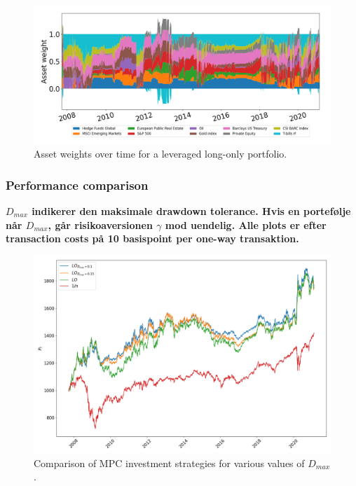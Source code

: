 \begin{figure}[H]
    \centering
    \includegraphics[width=1\textwidth]{analysis/portfolio_exercise/images/mle/weights_llo.png}
    \caption[Asset weights over time for a leveraged long-only portfolio]{Asset weights over time for a leveraged long-only portfolio.}
    \label{fig:MPC_port_weights_llo}
\end{figure}

\subsubsection*{Performance comparison}

\textbf{$D_{max}$ indikerer den maksimale drawdown tolerance. Hvis en portefølje når $D_{max}$, går risikoaversionen $\gamma$ mod uendelig. Alle plots er efter transaction costs på 10 basispoint per one-way transaktion.}

\begin{figure}[H]
    \centering
    \includegraphics[width=1\textwidth]{analysis/portfolio_exercise/images/mle/port_vals_lo.png}
    \caption[Comparison of MPC investment strategies for various values of $D_{max}$]{Comparison of MPC investment strategies for various values of $D_{max}$.}
    \label{fig:MPC_port_vals_lo}
\end{figure}

